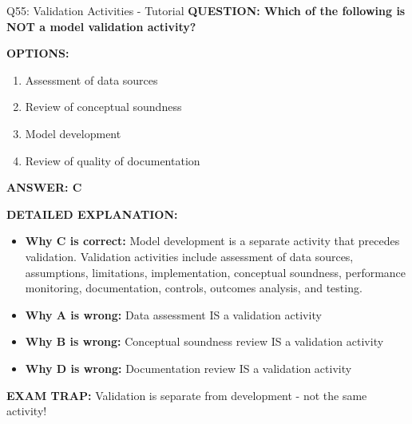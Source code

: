 \documentclass[8pt]{beamer}
\begin{document}
	\begin{frame}{Q55: Validation Activities - Tutorial}
		\fontsize{6.5}{7.5}\selectfont
		\textbf{QUESTION: Which of the following is NOT a model validation activity?}
		
		\vspace{0.1cm}
		\textbf{OPTIONS:}
		\begin{enumerate}
			\item Assessment of data sources
			\item Review of conceptual soundness
			\item Model development
			\item Review of quality of documentation
		\end{enumerate}
		
		\vspace{0.1cm}
		\textcolor{myblue}{\textbf{ANSWER: C}}
		
		\vspace{0.1cm}
		\textbf{DETAILED EXPLANATION:}
		\begin{itemize}
			\item \textbf{Why C is correct:} Model development is a separate activity that precedes validation. Validation activities include assessment of data sources, assumptions, limitations, implementation, conceptual soundness, performance monitoring, documentation, controls, outcomes analysis, and testing.
			\item \textbf{Why A is wrong:} Data assessment IS a validation activity
			\item \textbf{Why B is wrong:} Conceptual soundness review IS a validation activity
			\item \textbf{Why D is wrong:} Documentation review IS a validation activity
		\end{itemize}
		
		\textcolor{myred}{\textbf{EXAM TRAP:}} Validation is \textcolor{myblue}{separate from development} - not the same activity!
	\end{frame}
	
\end{document}

